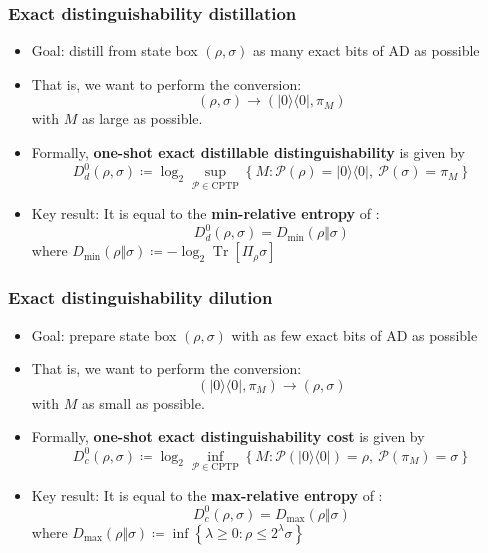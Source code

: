 \documentclass[usenames,dvipsnames,handout]{beamer}
\begin{document}
\begin{frame}
\frametitle{Exact distinguishability distillation}

\begin{itemize}

\pause
\item Goal: distill from state box $(\rho,\sigma)$ as many exact bits of AD as possible

\pause
\item That is, we want to perform the conversion:
$$
(\rho,\sigma) \rightarrow (|0\rangle\!\langle 0 |, \pi_M)
$$
with $M$ as large as possible.

\pause
\item Formally, {\color{MidnightBlue}\textbf{one-shot exact distillable distinguishability}}  is given by
$$
D_{d}^{0}(\rho,\sigma)\coloneqq 
\log_{2}\sup_{\mathcal{P}\in\text{CPTP}}\left\{  M:\mathcal{P}(\rho
)=|0\rangle\!\langle0|,\ \mathcal{P}(\sigma)=\pi_{M}\right\}  
$$

\pause
\item Key result: It is equal to the {\color{MidnightBlue}\textbf{min-relative entropy}} of \cite{D09}:
$$
D_{d}^{0}(\rho,\sigma) = D_{\min}(\rho \Vert \sigma)
$$
where $D_{\min}(\rho \Vert \sigma) \coloneqq  -\log_{2}\operatorname{Tr}[\Pi_{\rho}%
\sigma]$

\end{itemize}

\end{frame}


\begin{frame}
\frametitle{Exact distinguishability dilution}

\begin{itemize}

\pause
\item Goal: prepare state box $(\rho,\sigma)$ with as few exact bits of AD as possible

\pause
\item That is, we want to perform the conversion:
$$
(|0\rangle\!\langle 0 |, \pi_M) \rightarrow  (\rho,\sigma) 
$$
with $M$ as small as possible.

\pause
\item Formally, {\color{MidnightBlue}\textbf{one-shot exact distinguishability cost}}  is given by
$$
D_{c}^{0}(\rho,\sigma)\coloneqq 
\log_{2}\inf_{\mathcal{P}\in\text{CPTP}}\left\{  M:\mathcal{P}(|0\rangle
\langle0|)=\rho,\ \mathcal{P}(\pi_{M})=\sigma\right\}  
$$

\pause
\item Key result: It is equal to the {\color{MidnightBlue}\textbf{max-relative entropy}} of \cite{D09}:
$$
D_{c}^{0}(\rho,\sigma)=D_{\max}(\rho\Vert\sigma)
$$
where $D_{\max}(\rho\Vert\sigma)    \coloneqq \inf\left\{  \lambda\geq0:\rho\leq2^{\lambda
}\sigma\right\}$

\end{itemize}

\end{frame}
\end{document}

